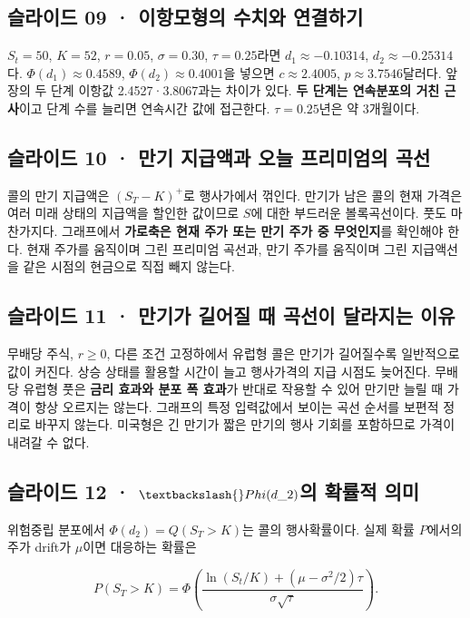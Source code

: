 \documentclass[11pt,a4paper]{article}
\begin{document}
\subsection{슬라이드 09 · 이항모형의 수치와 연결하기}
$S_t=50$, $K=52$, $r=0.05$, $\sigma=0.30$, $\tau=0.25$라면 $d_1\approx-0.10314$, $d_2\approx-0.25314$다. $\Phi(d_1)\approx0.4589$, $\Phi(d_2)\approx0.4001$을 넣으면 $c\approx2.4005$, $p\approx3.7546$달러다. 앞 장의 두 단계 이항값 2.4527·3.8067과는 차이가 있다. \textbf{두 단계는 연속분포의 거친 근사}이고 단계 수를 늘리면 연속시간 값에 접근한다. $\tau=0.25$년은 약 3개월이다.\par

\subsection{슬라이드 10 · 만기 지급액과 오늘 프리미엄의 곡선}
콜의 만기 지급액은 $(S_T-K)^+$로 행사가에서 꺾인다. 만기가 남은 콜의 현재 가격은 여러 미래 상태의 지급액을 할인한 값이므로 $S$에 대한 부드러운 볼록곡선이다. 풋도 마찬가지다. 그래프에서 \textbf{가로축은 현재 주가 또는 만기 주가 중 무엇인지}를 확인해야 한다. 현재 주가를 움직이며 그린 프리미엄 곡선과, 만기 주가를 움직이며 그린 지급액선을 같은 시점의 현금으로 직접 빼지 않는다.\par

\subsection{슬라이드 11 · 만기가 길어질 때 곡선이 달라지는 이유}
무배당 주식, $r\geq0$, 다른 조건 고정하에서 유럽형 콜은 만기가 길어질수록 일반적으로 값이 커진다. 상승 상태를 활용할 시간이 늘고 행사가격의 지급 시점도 늦어진다. 무배당 유럽형 풋은 \textbf{금리 효과와 분포 폭 효과}가 반대로 작용할 수 있어 만기만 늘릴 때 가격이 항상 오르지는 않는다. 그래프의 특정 입력값에서 보이는 곡선 순서를 보편적 정리로 바꾸지 않는다. 미국형은 긴 만기가 짧은 만기의 행사 기회를 포함하므로 가격이 내려갈 수 없다.\par

\subsection{슬라이드 12 · $\textbackslash{}Phi(d\_2)$의 확률적 의미}
위험중립 분포에서 $\Phi(d_2)=Q(S_T>K)$는 콜의 행사확률이다. 실제 확률 $P$에서의 주가 drift가 $\mu$이면 대응하는 확률은\par

\[
P(S_T>K)=\Phi\!\left(
\frac{\ln(S_t/K)+(\mu-\sigma^2/2)\tau}{\sigma\sqrt\tau}\right).
\]
\end{document}
